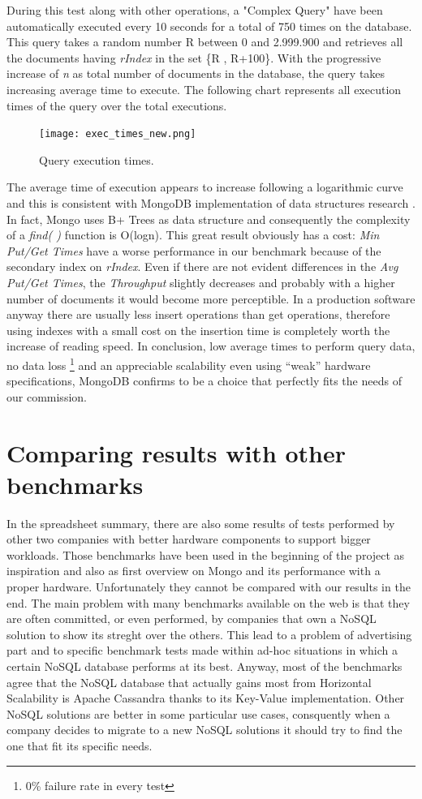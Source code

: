 During this test along with other operations, a "Complex Query" have been automatically executed every 10 seconds for a total of 750 times on the database. This query takes a random number  R between 0 and 2.999.900 and retrieves all the documents having  \textit{rIndex} in the set \{R , R+100\}.
With the progressive increase of \textit{n} as total number of documents in the database, the query takes increasing average time to execute. 
The following chart represents all execution times of the query over the total executions.
\begin{figure}[H]
\texttt{[image: exec\_times\_new.png]}
\centering
\caption{Query execution times.}
\end{figure}
The average time of execution appears to increase following a logarithmic curve and this is consistent with MongoDB implementation of data structures research .
In fact, Mongo uses B+ Trees as data structure and consequently the complexity of a \textit{find( )} function is O(logn).
This great result obviously has a cost: \textit{Min Put/Get Times} have a worse performance in our benchmark  because of the secondary index on \textit{rIndex}. 
Even if  there are not evident differences in the \textit{Avg Put/Get Times}, the \textit{Throughput} slightly decreases and probably with a higher number of documents it would become more perceptible.
In a production software anyway there are usually less insert operations than get operations, therefore using indexes with a small cost on the insertion time is completely worth the increase of reading speed.
In conclusion, low average times to perform query data, no data loss \footnote{0\% failure rate in every test } and an appreciable scalability even using  “weak” hardware specifications, MongoDB confirms to be a choice that perfectly fits the needs of our commission.
\section{Comparing results with other benchmarks}
\label{sec:5}
In the spreadsheet summary, there are also some results of tests performed by other two companies with better hardware components to support bigger workloads. Those benchmarks have been used in the beginning of the project as inspiration and also as first overview on Mongo and its performance with a proper hardware.
Unfortunately they cannot be compared with our results in the end.
The main problem with many benchmarks available on the web is that they are often committed, or even performed, by companies that own a NoSQL solution to show its streght over the others.
This lead to a problem of advertising part and to specific benchmark tests made within ad-hoc situations in which a certain NoSQL database performs at its best.
Anyway, most of the benchmarks agree that the NoSQL database that actually gains most from Horizontal Scalability is Apache Cassandra thanks to its Key-Value implementation.
Other NoSQL solutions are better in some particular use cases, consquently when a company decides to migrate to a new NoSQL solutions  it should try to find the one that fit its specific needs.
